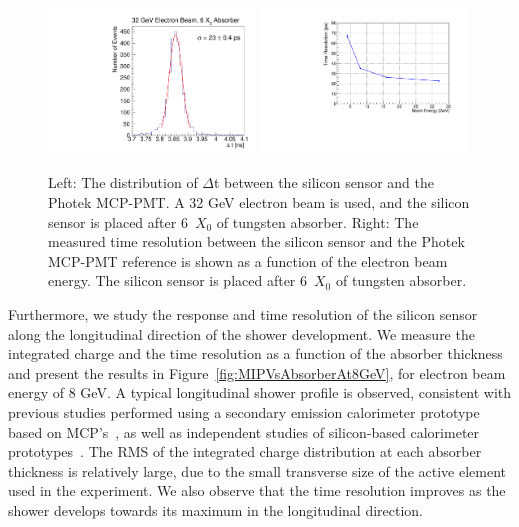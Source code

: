 \begin{figure}[htbp] 
\centering
\includegraphics[width=0.49\textwidth]{plots/deltaT_32GeV_6X0.pdf} 
\includegraphics[width=0.49\textwidth]{plots/SigmaT_vs_BeamEnergy_lin30Stamp.pdf} 
\caption{Left: The distribution of $\Delta$t between the silicon sensor and the
Photek MCP-PMT. A 32 GeV electron beam is used, and the silicon sensor is placed
after 6~$X_0$ of tungsten absorber. Right: The measured time resolution between
the silicon sensor and the Photek MCP-PMT reference is shown as a function of
the electron beam energy. The silicon sensor is placed after 6~$X_0$ of
tungsten absorber. } 
\label{fig:MIPVsEnergy} 
\end{figure} 

Furthermore, we study the response and time resolution of the silicon sensor
along the longitudinal direction of the shower development. We measure the
integrated charge and the time resolution as a function of the absorber
thickness and present the results in Figure~\ref{fig:MIPVsAbsorberAt8GeV}, for
electron beam energy of 8 GeV. A typical longitudinal shower profile is
observed, consistent with previous studies performed using a secondary emission
calorimeter prototype based on MCP's~\cite{Ronzhin2015288}, as well as
independent studies of silicon-based calorimeter prototypes~\cite{Muhuri201424}.
The RMS of the integrated charge distribution at each absorber thickness is
relatively large, due to the small transverse size of the active element used in
the experiment. We also observe that the time resolution improves as the shower
develops towards its maximum in the longitudinal direction. 

